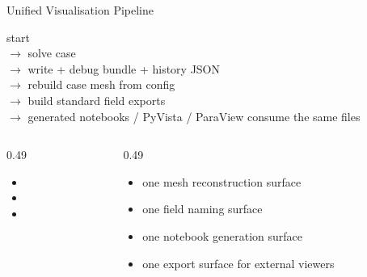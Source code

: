 \documentclass[aspectratio=169,10pt]{beamer}
\begin{document}
\begin{frame}{Unified Visualisation Pipeline}
\small
\begin{pseudobox}
start\\
$\rightarrow$ solve case\\
$\rightarrow$ write  + debug bundle + history JSON\\
$\rightarrow$ rebuild case mesh from config\\
$\rightarrow$ build standard field exports\\
$\rightarrow$ generated notebooks / PyVista / ParaView consume the same files
\end{pseudobox}
\vspace{0.20cm}
\begin{columns}[T,totalwidth=\textwidth]
\begin{column}{0.49\textwidth}
\begin{softbox}
\begin{itemize}
  \item {}
  \item {}
  \item {}
\end{itemize}
\end{softbox}
\end{column}
\begin{column}{0.49\textwidth}
\begin{softbox}
\begin{itemize}
  \item one mesh reconstruction surface
  \item one field naming surface
  \item one notebook generation surface
  \item one export surface for external viewers
\end{itemize}
\end{softbox}
\end{column}
\end{columns}
\end{frame}
\end{document}
